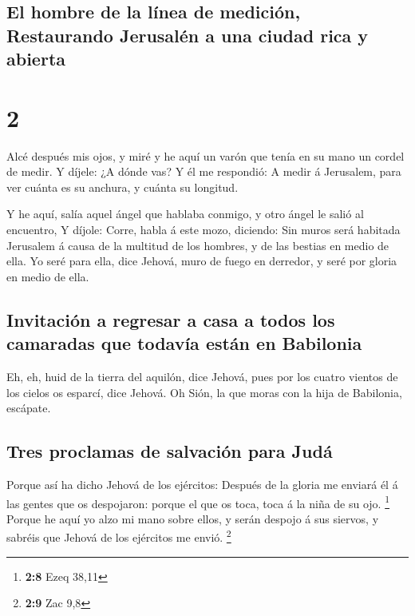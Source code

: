 \hypertarget{el-hombre-de-la-luxednea-de-mediciuxf3n-restaurando-jerusaluxe9n-a-una-ciudad-rica-y-abierta}{%
\subsection{El hombre de la línea de medición, Restaurando Jerusalén a
una ciudad rica y
abierta}\label{el-hombre-de-la-luxednea-de-mediciuxf3n-restaurando-jerusaluxe9n-a-una-ciudad-rica-y-abierta}}

\hypertarget{section-1}{%
\section{2}\label{section-1}}

 Alcé después mis ojos, y miré y he aquí un varón que tenía
en su mano un cordel de medir.  Y díjele: ¿A dónde vas? Y él
me respondió: A medir á Jerusalem, para ver cuánta es su anchura, y
cuánta su longitud.

 Y he aquí, salía aquel ángel que hablaba conmigo, y otro
ángel le salió al encuentro,  Y díjole: Corre, habla á este
mozo, diciendo: Sin muros será habitada Jerusalem á causa de la multitud
de los hombres, y de las bestias en medio de ella.  Yo seré
para ella, dice Jehová, muro de fuego en derredor, y seré por gloria en
medio de ella.

\hypertarget{invitaciuxf3n-a-regresar-a-casa-a-todos-los-camaradas-que-todavuxeda-estuxe1n-en-babilonia}{%
\subsection{Invitación a regresar a casa a todos los camaradas que
todavía están en
Babilonia}\label{invitaciuxf3n-a-regresar-a-casa-a-todos-los-camaradas-que-todavuxeda-estuxe1n-en-babilonia}}

 Eh, eh, huid de la tierra del aquilón, dice Jehová, pues
por los cuatro vientos de los cielos os esparcí, dice Jehová.
 Oh Sión, la que moras con la hija de Babilonia, escápate.

\hypertarget{tres-proclamas-de-salvaciuxf3n-para-juduxe1}{%
\subsection{Tres proclamas de salvación para
Judá}\label{tres-proclamas-de-salvaciuxf3n-para-juduxe1}}

 Porque así ha dicho Jehová de los ejércitos: Después de la
gloria me enviará él á las gentes que os despojaron: porque el que os
toca, toca á la niña de su ojo. \footnote{\textbf{2:8} Ezeq 38,11}
 Porque he aquí yo alzo mi mano sobre ellos, y serán despojo
á sus siervos, y sabréis que Jehová de los ejércitos me envió.
\footnote{\textbf{2:9} Zac 9,8}

